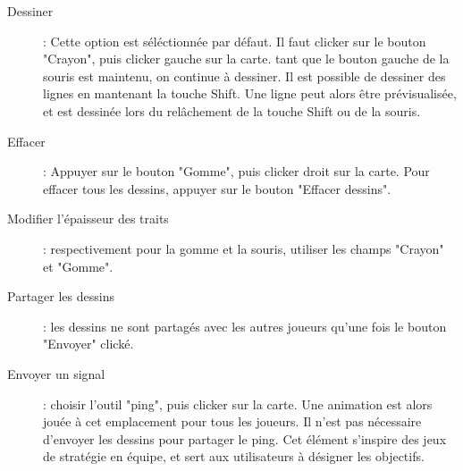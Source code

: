 \begin{description}
	\item[Dessiner]: Cette option est séléctionnée par défaut. Il faut clicker sur le bouton "Crayon", puis clicker gauche sur la carte. tant que le bouton gauche de la souris est maintenu, on continue à dessiner. Il est possible de dessiner des lignes en mantenant la touche Shift. Une ligne peut alors être prévisualisée, et est dessinée lors du relâchement de la touche Shift ou de la souris.
	\item[Effacer]: Appuyer sur le bouton "Gomme", puis clicker droit sur la carte. Pour effacer tous les dessins, appuyer sur le bouton "Effacer dessins".
	\item[Modifier l'épaisseur des traits]: respectivement pour la gomme et la souris, utiliser les champs "Crayon" et "Gomme".
	\item[Partager les dessins]: les dessins ne sont partagés avec les autres joueurs qu'une fois le bouton "Envoyer" clické.
	\item[Envoyer un signal]: choisir l'outil "ping", puis clicker sur la carte. Une animation est alors jouée à cet emplacement pour tous les joueurs. Il n'est pas nécessaire d'envoyer les dessins pour partager le ping. Cet élément s'inspire des jeux de stratégie en équipe, et sert aux utilisateurs à désigner les objectifs.
\end{description}





